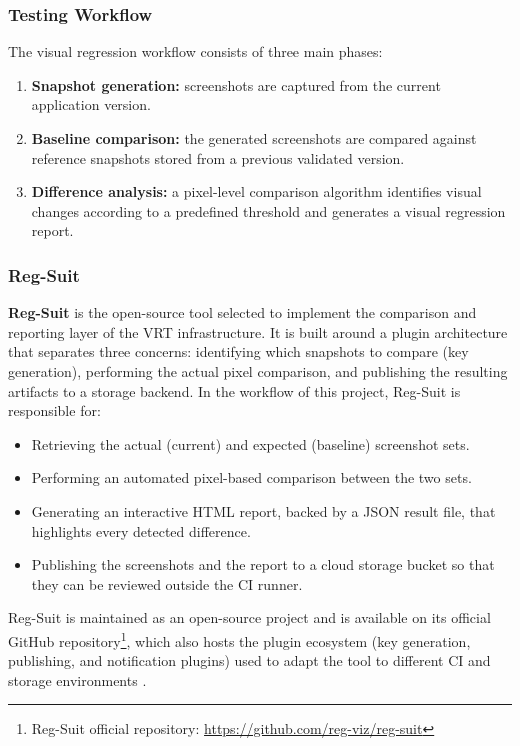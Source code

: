 \subsubsection{Testing Workflow}

The visual regression workflow consists of three main phases:

\begin{enumerate}
    \item \textbf{Snapshot generation:} screenshots are captured from the current application version.
    
    \item \textbf{Baseline comparison:} the generated screenshots are compared against reference snapshots stored from a previous validated version.
    
    \item \textbf{Difference analysis:} a pixel-level comparison algorithm identifies visual changes according to a predefined threshold and generates a visual regression report.
\end{enumerate}

\subsubsection{Reg-Suit}

\textbf{Reg-Suit} is the open-source tool selected to implement the comparison and reporting layer of the \ac{VRT} infrastructure. It is built around a plugin architecture that separates three concerns: identifying which snapshots to compare (key generation), performing the actual pixel comparison, and publishing the resulting artifacts to a storage backend. In the workflow of this project, Reg-Suit is responsible for:

\begin{itemize}
    \item Retrieving the actual (current) and expected (baseline) screenshot sets.
    \item Performing an automated pixel-based comparison between the two sets.
    \item Generating an interactive HTML report, backed by a JSON result file, that highlights every detected difference.
    \item Publishing the screenshots and the report to a cloud storage bucket so that they can be reviewed outside the \ac{CI} runner.
\end{itemize}

Reg-Suit is maintained as an open-source project and is available on its official GitHub repository\footnote{Reg-Suit official repository: \url{https://github.com/reg-viz/reg-suit}}, which also hosts the plugin ecosystem (key generation, publishing, and notification plugins) used to adapt the tool to different \ac{CI} and storage environments \cite{regsuit_repo}.

